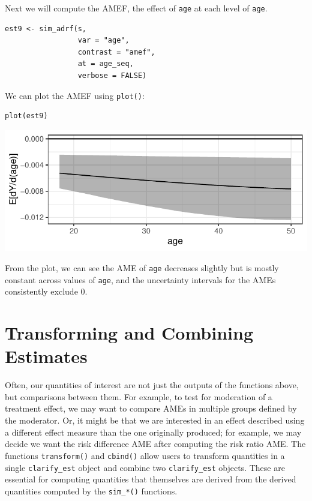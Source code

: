 Next we will compute the AMEF, the effect of \texttt{age} at each level of \texttt{age}.

\begin{verbatim}
est9 <- sim_adrf(s,
                 var = "age",
                 contrast = "amef",
                 at = age_seq,
                 verbose = FALSE)
\end{verbatim}

We can plot the AMEF using \texttt{plot()}:

\begin{verbatim}
plot(est9)
\end{verbatim}

\begin{center}\includegraphics{figures/plot9-1} \end{center}

From the plot, we can see the AME of \texttt{age} decreases slightly but is mostly constant across values of \texttt{age}, and the uncertainty intervals for the AMEs consistently exclude 0.

\section{Transforming and Combining Estimates}\label{transforming-and-combining-estimates}

Often, our quantities of interest are not just the outputs of the functions above, but comparisons between them. For example, to test for moderation of a treatment effect, we may want to compare AMEs in multiple groups defined by the moderator. Or, it might be that we are interested in an effect described using a different effect measure than the one originally produced; for example, we may decide we want the risk difference AME after computing the risk ratio AME. The functions \texttt{transform()} and \texttt{cbind()} allow users to transform quantities in a single \texttt{clarify\_est} object and combine two \texttt{clarify\_est} objects. These are essential for computing quantities that themselves are derived from the derived quantities computed by the \texttt{sim\_*()} functions.

